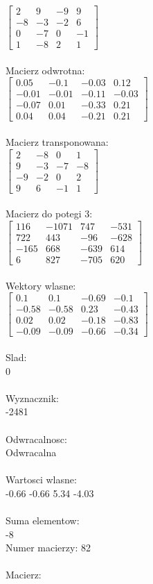 \documentclass[a4paper,12pt]{article}
\begin{document}
$\begin{bmatrix} 2&9&-9&9\\-8&-3&-2&6\\0&-7&0&-1\\1&-8&2&1 \end{bmatrix}$
\\
\\
Macierz odwrotna:\\

$\begin{bmatrix} 0.05&-0.1&-0.03&0.12\\-0.01&-0.01&-0.11&-0.03\\-0.07&0.01&-0.33&0.21\\0.04&0.04&-0.21&0.21 \end{bmatrix}$
\\
\\
Macierz transponowana:\\

$\begin{bmatrix} 2&-8&0&1\\9&-3&-7&-8\\-9&-2&0&2\\9&6&-1&1 \end{bmatrix}$
\\
\\
Macierz do potegi 3:\\

$\begin{bmatrix} 116&-1071&747&-531\\722&443&-96&-628\\-165&668&-639&614\\6&827&-705&620 \end{bmatrix}$
\\
\\
Wektory wlasne:\\

$\begin{bmatrix} 0.1&0.1&-0.69&-0.1\\-0.58&-0.58&0.23&-0.43\\0.02&0.02&-0.18&-0.83\\-0.09&-0.09&-0.66&-0.34 \end{bmatrix}$
\\
\\
Slad:\\
0
\\
\\
Wyznacznik:\\
-2481
\\
\\
Odwracalnosc:\\
Odwracalna
\\
\\
Wartosci wlasne:\\
-0.66 -0.66 5.34 -4.03
\\
\\
Suma elementow:\\
-8
\\
\newpage
Numer macierzy:
82
\\
\\
Macierz:\\
\end{document}
